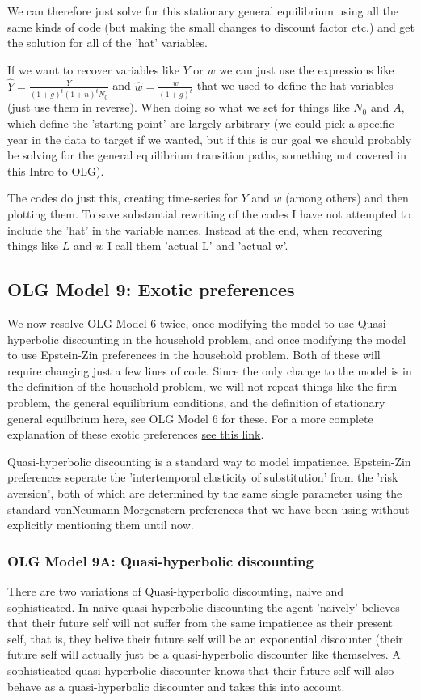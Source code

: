 We can therefore just solve for this stationary general equilibrium using all the same kinds of code (but making the small changes to discount factor etc.) and get the solution for all of the 'hat' variables.

If we want to recover variables like $Y$ or $w$ we can just use the expressions like $\hat{Y} =\frac{Y}{(1+g)^t (1+n)^t N_0}$ and $\hat{w} = \frac{w}{(1+g)^t}$ that we used to define the hat variables (just use them in reverse). When doing so what we set for things like $N_0$ and $A$, which define the 'starting point' are largely arbitrary (we could pick a specific year in the data to target if we wanted, but if this is our goal we should probably be solving for the general equilibrium transition paths, something not covered in this Intro to OLG).

The codes do just this, creating time-series for $Y$ and $w$ (among others) and then plotting them. To save substantial rewriting of the codes I have not attempted to include the 'hat' in the variable names. Instead at the end, when recovering things like $L$ and $w$ I call them 'actual L' and 'actual w'.


\subsection{OLG Model 9: Exotic preferences}
We now resolve OLG Model 6 twice, once modifying the model to use Quasi-hyperbolic discounting in the household problem, and once modifying the model to use Epstein-Zin preferences in the household problem. Both of these will require changing just a few lines of code. Since the only change to the model is in the definition of the household problem, we will not repeat things like the firm problem, the general equilibrium conditions, and the definition of stationary general equilbrium here, see OLG Model 6 for these. For a more complete explanation of these exotic preferences \textcolor{blue}{\href{https://www.vfitoolkit.com/updates-blog/2021/exotic-preferences-epstein-zin-quasi-hyperbolic/}{see this link}}.

Quasi-hyperbolic discounting is a standard way to model impatience. Epstein-Zin preferences seperate the 'intertemporal elasticity of substitution' from the 'risk aversion', both of which are determined by the same single parameter using the standard vonNeumann-Morgenstern preferences that we have been using without explicitly mentioning them until now.

\subsubsection{OLG Model 9A: Quasi-hyperbolic discounting}
There are two variations of Quasi-hyperbolic discounting, naive and sophisticated. In naive quasi-hyperbolic discounting the agent 'naively' believes that their future self will not suffer from the same impatience as their present self, that is, they belive their future self will be an exponential discounter (their future self will actually just be a quasi-hyperbolic discounter like themselves. A sophisticated quasi-hyperbolic discounter knows that their future self will also behave as a quasi-hyperbolic discounter and takes this into account.


